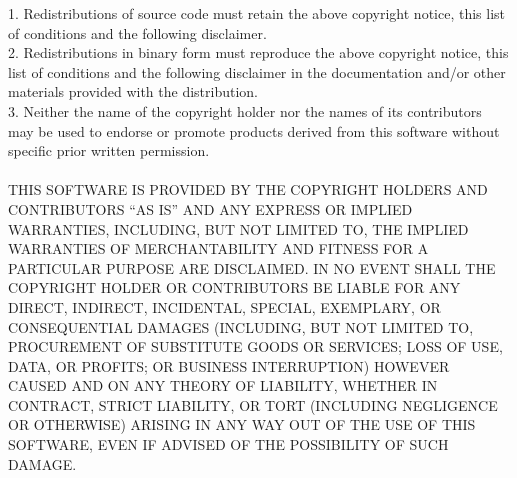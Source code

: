\documentclass[a4paper,11pt]{article}
\theoremstyle{mytheor}
\theoremstyle{mytheor}
\begin{document}
1. Redistributions of source code must retain the above copyright notice, this list of conditions and the following disclaimer.\\

2. Redistributions in binary form must reproduce the above copyright notice, this list of conditions and the following disclaimer in the documentation and/or other materials provided with the distribution.\\

3. Neither the name of the copyright holder nor the names of its contributors may be used to endorse or promote products derived from this software without specific prior written permission.
\\\\
THIS SOFTWARE IS PROVIDED BY THE COPYRIGHT HOLDERS AND CONTRIBUTORS “AS IS” AND ANY EXPRESS OR IMPLIED WARRANTIES, INCLUDING, BUT NOT LIMITED TO, THE IMPLIED WARRANTIES OF MERCHANTABILITY AND FITNESS FOR A PARTICULAR PURPOSE ARE DISCLAIMED. IN NO EVENT SHALL THE COPYRIGHT HOLDER OR CONTRIBUTORS BE LIABLE FOR ANY DIRECT, INDIRECT, INCIDENTAL, SPECIAL, EXEMPLARY, OR CONSEQUENTIAL DAMAGES (INCLUDING, BUT NOT LIMITED TO, PROCUREMENT OF SUBSTITUTE GOODS OR SERVICES; LOSS OF USE, DATA, OR PROFITS; OR BUSINESS INTERRUPTION) HOWEVER CAUSED AND ON ANY THEORY OF LIABILITY, WHETHER IN CONTRACT, STRICT LIABILITY, OR TORT (INCLUDING NEGLIGENCE OR OTHERWISE) ARISING IN ANY WAY OUT OF THE USE OF THIS SOFTWARE, EVEN IF ADVISED OF THE POSSIBILITY OF SUCH DAMAGE.
\newpage
\end{document}
